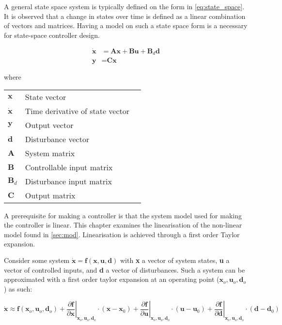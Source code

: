 A general state space system is typically defined on the form in \cref{eq:state_space}. It is observed that a change in states over time is defined as a linear combination of vectors and matrices. Having a model on such a state space form is a necessary for state-space controller design.

\begin{equation} \label{eq:state_space}
	\begin{split}
		\dot{\textbf{x}} & = \textbf{A}\textbf{x} + \textbf{B}\textbf{u} + \textbf{B}_d\textbf{d} \\
		\textbf{y} 		& = \textbf{C}\textbf{x}
	\end{split}
\end{equation}

where

\begin{center}
	\begin{tabular}{l p{8cm} l}
		$\textbf{x}$       & State vector                    &  \\
		$\dot{\textbf{x}}$ & Time derivative of state vector &  \\
		$\textbf{y}$       & Output vector                   &  \\
		$\textbf{d}$       & Disturbance vector              &  \\
		$\textbf{A}$       & System matrix                   &  \\
		$\textbf{B}$       & Controllable input matrix       &  \\
		$\textbf{B}_d$     & Disturbance input matrix        &  \\
		$\textbf{C}$       & Output matrix                   &
	\end{tabular}
\end{center}

A prerequisite for making a controller is that the system model used for making the controller is linear. This chapter examines the linearisation of the non-linear model found in \cref{sec:mod}. Linearisation is achieved through a first order Taylor expansion.

Consider some system $\dot{\textbf{x}} = \textbf{f}(\textbf{x},\textbf{u},\textbf{d})$ with \textbf{x} a vector of system states, \textbf{u} a vector of controlled inputs, and \textbf{d} a vector of disturbances. Such a system can be approximated with a first order taylor expansion at an operating point ($\textbf{x}_o, \textbf{u}_o, \textbf{d}_o$) as such:

\begin{equation} \label{eq:taylor}
	\dot{\textbf{x}}   \approx   \textbf{f}(\textbf{x}_o, \textbf{u}_o, \textbf{d}_o)   +
	\left. \dfrac{\partial \textbf{f}}{\partial \textbf{x}} \right |_{\textbf{x}_o, \textbf{u}_o, \textbf{d}_o} \cdot (\textbf{x}-\textbf{x}_0) +
	\left. \dfrac{\partial \textbf{f}}{\partial \textbf{u}} \right |_{\textbf{x}_o, \textbf{u}_o, \textbf{d}_o} \cdot (\textbf{u}-\textbf{u}_0) +
	\left. \dfrac{\partial \textbf{f}}{\partial \textbf{d}} \right |_{\textbf{x}_o, \textbf{u}_o, \textbf{d}_o} \cdot (\textbf{d}-\textbf{d}_0)
\end{equation}

